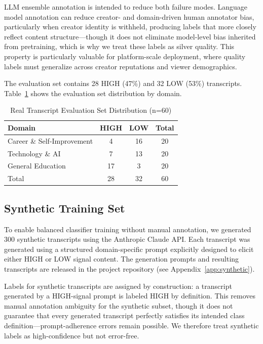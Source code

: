 \documentclass[11pt,a4paper]{article}
\begin{document}
LLM ensemble annotation is intended to reduce both failure modes. Language model annotation can reduce
creator- and domain-driven human annotator bias, particularly when creator identity is withheld,
producing labels that more closely reflect content structure---though it does not eliminate
model-level bias inherited from pretraining, which is why we treat these labels as silver
quality. This property is particularly valuable for platform-scale deployment, where quality
labels must generalize across creator reputations and viewer demographics.

The evaluation set contains 28 HIGH (47\%) and 32 LOW (53\%) transcripts. Table~\ref{tab:eval}
shows the evaluation set distribution by domain.

\begin{table}[h]
\centering
\caption{Real Transcript Evaluation Set Distribution (n=60)}
\label{tab:eval}
\begin{tabular}{lccc}
\toprule
Domain & HIGH & LOW & Total \\
\midrule
Career \& Self-Improvement & 4 & 16 & 20 \\
Technology \& AI & 7 & 13 & 20 \\
General Education & 17 & 3 & 20 \\
\midrule
Total & 28 & 32 & 60 \\
\bottomrule
\end{tabular}
\end{table}

\subsection{Synthetic Training Set}

To enable balanced classifier training without manual annotation, we generated 300 synthetic
transcripts using the Anthropic Claude API. Each transcript was generated using a structured
domain-specific prompt explicitly designed to elicit either HIGH or LOW signal content. The
generation prompts and resulting transcripts are released in the project repository (see
Appendix~\ref{app:synthetic}).

Labels for synthetic transcripts are assigned by construction: a transcript generated by a
HIGH-signal prompt is labeled HIGH by definition. This removes manual annotation ambiguity for the synthetic subset, though it does not guarantee
that every generated transcript perfectly satisfies its intended class definition---prompt-adherence
errors remain possible. We therefore treat synthetic labels as high-confidence but not error-free.
\end{document}
